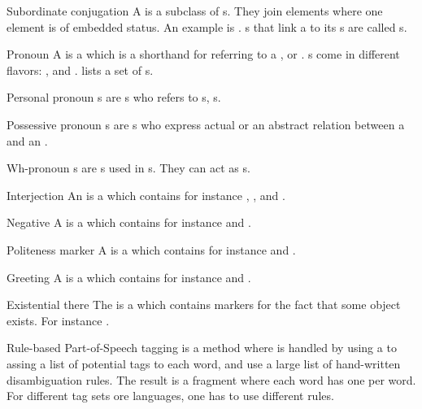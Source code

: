 \begin{df}{Subordinate conjugation}
A \sb{} is a subclass of s. They join elements where one element is of embedded status. An example is . \sb{}s that link a  to its s are called s.
\end{df}
\begin{df}{Pronoun}
A \sb{} is a  which is a shorthand for referring to a ,  or . \sb{}s come in different flavors: ,  and .  lists a set of \sb{}s.
\end{df}
\begin{df}{Personal pronoun}
\sb{}s are s who refers to s, s.
\end{df}
\begin{df}{Possessive pronoun}
\sb{}s are s who express actual  or an abstract relation between a  and an .
\end{df}
\begin{df}{Wh-pronoun}
\sb{}s are s used in s. They can act as s.
\end{df}
\begin{df}{Interjection}
An \sb{} is a  which contains for instance , ,  and .
\end{df}
\begin{df}{Negative}
A \sb{} is a  which contains for instance  and .
\end{df}
\begin{df}{Politeness marker}
A \sb{} is a  which contains for instance  and .
\end{df}
\begin{df}{Greeting}
A \sb{} is a  which contains for instance  and .
\end{df}
\begin{df}{Existential there}
The \sb{} is a  which contains markers for the fact that some object exists. For instance .
\end{df}
\begin{df}{Rule-based Part-of-Speech tagging}
\sb{} is a method where  is handled by using a  to assing a list of potential tags to each word, and use a large list of hand-written disambiguation rules. The result is a fragment where each word has one  per word. For different tag sets ore languages, one has to use different rules.
\end{df}
